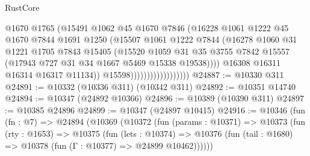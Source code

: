 \begin{lexlean}{RustCore}
\begin{coremodule}
                                        @1670
                                        @1765
                                        (@15491
                                          @1062
                                          @45
                                          @1670
                                          @7846
                                          (@16228
                                            @1061
                                            @1222
                                            @45
                                            @1670
                                            @7844
                                            @1691
                                            @1250
                                            (@15507
                                              @1061
                                              @1222
                                              @7844
                                              (@16278
                                                @1060
                                                @31
                                                @1221
                                                @1705
                                                @7843
                                                @15405
                                                (@15520
                                                  @1059
                                                  @31
                                                  @35
                                                  @3755
                                                  @7842
                                                  @15557
                                                  (@17943 @727 @31 @34 @1667 @5469 @15338 @19538))))
                                            @16308
                                            @16311
                                            @16314
                                            @16317
                                            @11134))
                                        @15598))))))))))))))))))
@24887 := @10330 @311
@24891 := @10332 (@10336 @311) (@10342 @311)
@24892 := @10351 @14740
@24894 := @10347 (@24892 @10366)
@24896 := @10389 (@10390 @311)
@24897 := @10385 @24896
@24899 := @10347 (@24897 @10415)
@24916 := @10346
    (fun (fn : @7) =>
    @24894
      (@10369
        (@10372
          (fun (params : @10371) =>
          @10373
            (fun (rty : @1653) =>
            @10375
              (fun (lets : @10374) =>
              @10376 (fun (tail : @1680) => @10378 (fun (Γ : @10377) => @24899 @10462))))))

\end{coremodule}
\end{lexlean}
